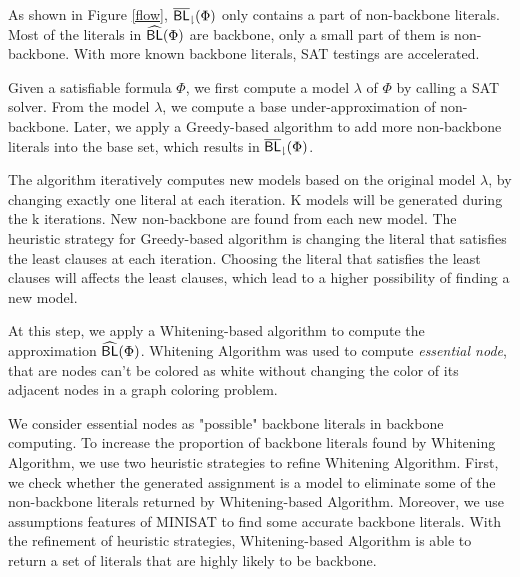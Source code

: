 As shown in Figure \ref{flow}, ${\sf \overline{BL}_\downharpoonright}(\Phi)$ only contains a part of non-backbone literals.
Most of the literals in ${\sf \widehat{BL}}(\Phi)$ are backbone, only a small part of them is non-backbone.
With more known backbone literals, SAT testings are accelerated.

\medskip
{}
Given a satisfiable formula $\Phi$, we first compute a model $\lambda$ of $\Phi$ by calling a SAT solver.
From the model $\lambda$, we compute a base under-approximation of non-backbone.
Later, we apply a Greedy-based algorithm to add more non-backbone literals into the base set, which results in ${\sf \overline{BL}_\downharpoonright}(\Phi)$.

The algorithm iteratively computes new models based on the original model $\lambda$, by changing exactly one literal at each iteration. K models will be generated during the k iterations. New non-backbone are found from each new model. The heuristic strategy for Greedy-based algorithm is changing the literal that satisfies the least clauses at each iteration. 
Choosing the literal that satisfies the least clauses will affects the least clauses, which lead to a higher possibility of finding a new model.

\medskip
{}
At this step, we apply a Whitening-based algorithm to compute the approximation ${\sf \widehat{BL}}(\Phi)$.
Whitening Algorithm was used to compute \emph{essential node}, that are nodes can't be colored as white without changing the color of its adjacent nodes in a graph coloring problem.


We consider essential nodes as "possible" backbone literals in backbone computing.
To increase the proportion of backbone literals found by Whitening Algorithm, we use two heuristic strategies to refine Whitening Algorithm.
First, we check whether the generated assignment is a model to eliminate some of the non-backbone literals returned by Whitening-based Algorithm.
Moreover, we use assumptions features of MINISAT \cite{JLM15} to find some accurate backbone literals.
With the refinement of heuristic strategies, Whitening-based Algorithm is able to return a set of literals that are highly likely to be backbone.


